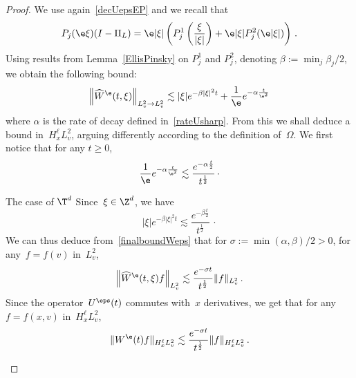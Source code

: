 \begin{proof}
We use again~\eqref{decUepsEP} and we recall that
\[
P_j(\e \xi)(I-\Pi_{L})= \e|\xi| \left(P^1_{j}\left(\frac{\xi}{|\xi|}\right) + \e |\xi| P^2_{j}(\e |\xi|)\right)\,.
\]
Using results from Lemma~\ref{EllisPinsky} on $P^1_j$ and $P^2_j$, denoting $\beta := \min_j \beta_j/2$, we obtain the following bound:
\begin{equation}\label{finalboundWeps}
\left\|\widehat W^\e(t,\xi)\right\|_{L^2_v \to L^2_v} \lesssim |\xi| e^{-\beta |\xi|^2t} + \frac{1}{\e} e^{-\alpha \frac{t}{\e^2}}
\end{equation}
where $\alpha$ is the rate of decay defined in~\eqref{rateUsharp}. From this we shall deduce a bound in~$H^\ell_xL^2_v$, arguing differently according to the definition of~$\Omega$. We first notice that for any $t \ge 0$,
\begin{equation}\label{texp}
\frac{1}{\e} e^{-\alpha \frac{t}{\e^2}} \lesssim \frac{e^{-\alpha \frac{t}{2}}}{t^\frac12} \, \cdotp
\end{equation}

\begin{step}{The case of $\T^d$}
Since~$\xi \in \Z^d$, we have
\[
|\xi| e^{-\beta |\xi|^2t} \lesssim \frac{e^{-\beta \frac{t}{2}} }{t^\frac12}\, \cdotp
\]
We can thus deduce from~\eqref{finalboundWeps} that for $\sigma:=\min(\alpha,\beta)/2>0$, for any~$f = f(v)$ in~$L^2_v$,
\[
\left\|\widehat W^\e(t,\xi)f\right\|_{L^2_v} \lesssim \frac{e^{- \sigma t}}{t^\frac12} \|f\|_{L^2_v} \,.
\]
Since the operator~$U^\eps(t)$ commutes with~$x$ derivatives, we get that for any~$f = f(x,v) $ in~$ H^\ell_xL^2_v$,
\[
\|W^\e(t) f\|_{H^\ell_xL^2_v} \lesssim \frac{e^{-\sigma t}}{t^\frac12} \|f\|_{H^\ell_xL^2_v}\,.
\]
\end{step}


\end{proof}
